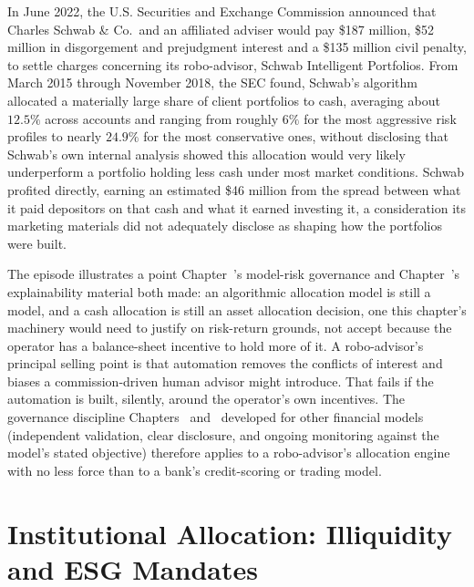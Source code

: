 \documentclass[../ai_in_finance]{subfiles}
\begin{document}
\label{sec:schwab-vignette}

In June 2022, the U.S. Securities and Exchange Commission announced that Charles Schwab \& Co.\ and an affiliated adviser would pay \$187 million, \$52 million in disgorgement and prejudgment interest and a \$135 million civil penalty, to settle charges concerning its robo-advisor, Schwab Intelligent Portfolios.
From March 2015 through November 2018, the SEC found, Schwab's algorithm allocated a materially large share of client portfolios to cash, averaging about $12.5\%$ across accounts and ranging from roughly $6\%$ for the most aggressive risk profiles to nearly $24.9\%$ for the most conservative ones, without disclosing that Schwab's own internal analysis showed this allocation would very likely underperform a portfolio holding less cash under most market conditions.
Schwab profited directly, earning an estimated \$46 million from the spread between what it paid depositors on that cash and what it earned investing it, a consideration its marketing materials did not adequately disclose as shaping how the portfolios were built.

The episode illustrates a point Chapter~'s model-risk governance and Chapter~'s explainability material both made: an algorithmic allocation model is still a model, and a cash allocation is still an asset allocation decision, one this chapter's machinery would need to justify on risk-return grounds, not accept because the operator has a balance-sheet incentive to hold more of it.
A robo-advisor's principal selling point is that automation removes the conflicts of interest and biases a commission-driven human advisor might introduce. That fails if the automation is built, silently, around the operator's own incentives. The governance discipline Chapters~ and~ developed for other financial models (independent validation, clear disclosure, and ongoing monitoring against the model's stated objective) therefore applies to a robo-advisor's allocation engine with no less force than to a bank's credit-scoring or trading model.

\section{Institutional Allocation: Illiquidity and ESG Mandates}
\end{document}
